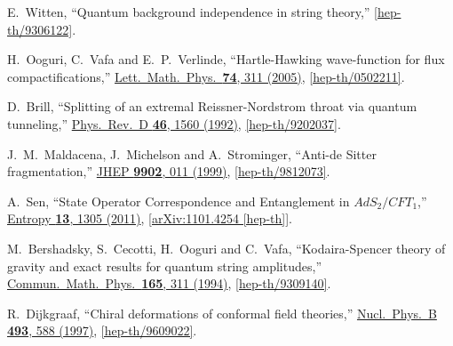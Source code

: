 \documentclass[11pt]{article}
\renewcommand{\[}{\begin{eqnarray}}
\renewcommand{\]}{\end{eqnarray}}
\begin{document}
\begin{thebibliography}{99}
  E.~Witten,
  ``Quantum background independence in string theory,''
  \href{http://arxiv.org/abs/hep-th/9306122}{[hep-th/9306122]}.



  H.~Ooguri, C.~Vafa and E.~P.~Verlinde,
  ``Hartle-Hawking wave-function for flux compactifications,''
  \href{http://dx.doi.org/10.1007/s11005-005-0022-x}{Lett.\ Math.\ Phys.\  {\bf 74}, 311 (2005)},
 \href{http://arxiv.org/abs/hep-th/0502211}{[hep-th/0502211]}.

  D.~Brill,
  ``Splitting of an extremal Reissner-Nordstrom throat via quantum tunneling,''
 \href{http://dx.doi.org/10.1103/PhysRevD.46.1560}{Phys.\ Rev.\ D {\bf 46}, 1560 (1992)},
 \href{http://arxiv.org/abs/hep-th/9202037}{[hep-th/9202037]}.

  J.~M.~Maldacena, J.~Michelson and A.~Strominger,
  ``Anti-de Sitter fragmentation,''
  \href{http://dx.doi.org/10.1088/1126-6708/1999/02/011}{JHEP {\bf 9902}, 011 (1999)},
  \href{http://arxiv.org/abs/hep-th/9812073}{[hep-th/9812073]}.

  A.~Sen,
  ``State Operator Correspondence and Entanglement in $AdS_2/CFT_1$,''
  \href{http://dx.doi.org/10.3390/e13071305}{Entropy {\bf 13}, 1305 (2011)},
 \href{http://arxiv.org/abs/1101.4254}{[arXiv:1101.4254 [hep-th]]}.

  M.~Bershadsky, S.~Cecotti, H.~Ooguri and C.~Vafa,
  ``Kodaira-Spencer theory of gravity and exact results for quantum string amplitudes,''
   \href{http://dx.doi.org/10.1007/BF02099774}{Commun.\ Math.\ Phys.\  {\bf 165}, 311 (1994)},
  \href{http://arxiv.org/abs/hep-th/9309140}{[hep-th/9309140]}.

  R.~Dijkgraaf,
  ``Chiral deformations of conformal field theories,''
  \href{http://dx.doi.org/10.1016/S0550-3213(97)00153-3}{Nucl.\ Phys.\ B {\bf 493}, 588 (1997)},
  \href{http://arxiv.org/abs/hep-th/9609022}{[hep-th/9609022]}.




\end{thebibliography}
\end{document}
